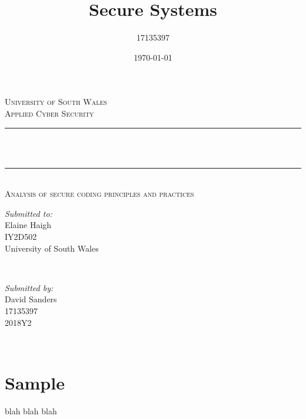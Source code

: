 \documentclass[12pt]{article}
\title{Secure Systems}
\author{17135397}
\date{\today}
\makeatletter
\let\thetitle\@title
\makeatother
\begin{document}

\begin{titlepage}
	\centering
  \textsc{\LARGE University of South Wales\\\Large Applied Cyber Security}\\[2cm]

	\rule{\linewidth}{0.2 mm} \\[0.5cm]
	{ \huge \bfseries \thetitle}\\
	\rule{\linewidth}{0.2 mm} \\[1cm]

  \textsc{\Large Analysis of secure coding principles and practices}\\[2cm]

	\begin{minipage}{0.4\textwidth}
		\begin{flushleft} \large
			\textit{Submitted to:}\\
			Elaine Haigh\\
        IY2D502\\
        University of South Wales\\
			\end{flushleft}
			\end{minipage}~
			\begin{minipage}{0.4\textwidth}

			\begin{flushright} \large
			\textit{Submitted by:} \\
			David Sanders\\
            17135397\\
            2018Y2\\
		\end{flushright}
	\end{minipage}\\[2 cm]

\end{titlepage}


\tableofcontents
\pagebreak


\section{Sample}
blah blah blah
\end{document}
